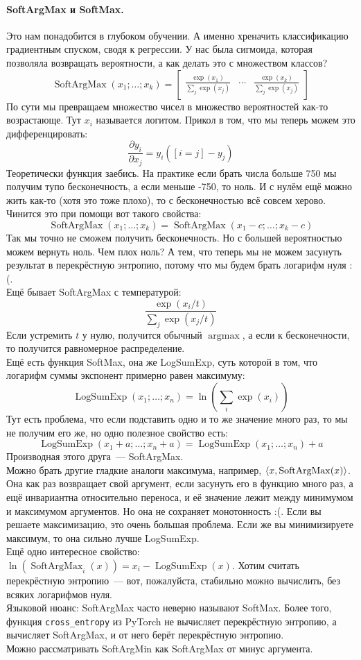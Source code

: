 \documentclass{article}
\DeclareMathOperator{\SoftArgMax}{SoftArgMax}
\DeclareMathOperator{\SoftMax}{LogSumExp}
\begin{document}
    \paragraph{SoftArgMax и SoftMax.}
    Это нам понадобится в глубоком обучении. А именно хреначить классификацию градиентным спуском, сводя к регрессии. У нас была сигмоида, которая позволяла возвращать вероятности, а как делать это с множеством классов?
    \[
    \SoftArgMax(x_1;\ldots;x_k)=\left[\begin{matrix}\frac{\exp(x_1)}{\sum_j\exp(x_j)}&\cdots&\frac{\exp(x_k)}{\sum_j\exp(x_j)}\end{matrix}\right]
    \]
    По сути мы превращаем множество чисел в множество вероятностей как-то возрастающе. Тут $x_i$ называется логитом. Прикол в том, что мы теперь можем это дифференцировать:
    \[
    \frac{\partial y_i}{\partial x_j}=y_i([i=j]-y_j)
    \]
    Теоретически функция заебись. На практике если брать числа больше 750 мы получим тупо бесконечность, а если меньше -750, то ноль. И с нулём ещё можно жить как-то (хотя это тоже плохо), то с бесконечностью всё совсем херово.\\
    Чинится это при помощи вот такого свойства:
    \[
    \SoftArgMax(x_1;\ldots;x_k)=\SoftArgMax(x_1-c;\ldots;x_k-c)
    \]
    Так мы точно не сможем получить бесконечность. Но с большей вероятностью можем вернуть ноль. Чем плох ноль? А тем, что теперь мы не можем засунуть результат в перекрёстную энтропию, потому что мы будем брать логарифм нуля :(.\\
    Ещё бывает SoftArgMax с температурой:
    \[
    \frac{\exp(x_i/t)}{\sum_j\exp(x_j/t)}
    \]
    Если устремить $t$ у нулю, получится обычный $\operatorname{argmax}$, а если к бесконечности, то получится равномерное распределение.\\
    Ещё есть функция SoftMax, она же LogSumExp, суть которой в том, что логарифм суммы экспонент примерно равен максимуму:
    \[
    \SoftMax(x_1;\ldots;x_n)=\ln\left(\sum\limits_i\exp(x_i)\right)
    \]
    Тут есть проблема, что если подставить одно и то же значение много раз, то мы не получим его же, но одно полезное свойство есть:
    \[
    \SoftMax(x_1+a;\ldots;x_n+a)=\SoftMax(x_1;\ldots;x_n)+a
    \]
    Производная этого друга~--- SoftArgMax.\\
    Можно брать другие гладкие аналоги максимума, например, $\dotprod{x}{\SoftArgMax(x)}$. Она как раз возвращает свой аргумент, если засунуть его в функцию много раз, а ещё инвариантна относительно переноса, и её значение лежит между минимумом и максимумом аргументов. Но она не сохраняет монотонность :(. Если вы решаете максимизацию, это очень большая проблема. Если же вы минимизируете максимум, то она сильно лучше LogSumExp.\\
    Ещё одно интересное свойство: $\ln(\SoftArgMax_i(x))=x_i-\SoftMax(x)$. Хотим считать перекрёстную энтропию~--- вот, пожалуйста, стабильно можно вычислить, без всяких логарифмов нуля.\\
    Языковой нюанс: SoftArgMax часто неверно называют SoftMax. Более того, функция \Verb|cross_entropy| из PyTorch  не вычисляет перекрёстную энтропию, а вычисляет SoftArgMax, и от него берёт перекрёстную энтропию.\\
    Можно рассматривать SoftArgMin как SoftArgMax от минус аргумента.
\end{document}
